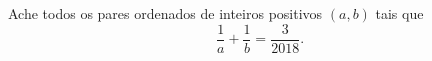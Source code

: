Ache todos os pares ordenados de inteiros positivos $\left(a,b\right)$ tais que \[\frac{1}{a}+\frac{1}{b}=\frac{3}{2018}.\]
